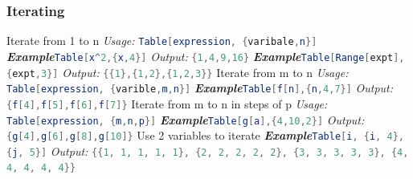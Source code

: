 \documentclass[a4paper]{book}
\begin{document}
\subsubsection{Iterating}
\noindent Iterate from 1 to n
\newline
\emph{Usage:} \lstinline[language=Mathematica]|Table[expression, {varibale,n}]|
\newline
\noindent\emph{\textbf{Example}}\quad \lstinline[language=Mathematica]|Table[x^2,{x,4}]| \hspace{\fill}\emph{Output:} \lstinline[language=Mathematica]|{1,4,9,16}|
\newline
\noindent\emph{\textbf{Example}}\quad \lstinline[language=Mathematica]|Table[Range[expt],{expt,3}]| \hspace{\fill}\emph{Output:} \lstinline[language=Mathematica]|{{1},{1,2},{1,2,3}}|
\newline
\newline
\noindent Iterate from m to n
\newline
\emph{Usage:} \lstinline[language=Mathematica]|Table[expression, {varible,m,n}]|
\newline
\noindent\emph{\textbf{Example}}\quad \lstinline[language=Mathematica]|Table[f[n],{n,4,7}]| \hspace{\fill}\emph{Output:} \lstinline[language=Mathematica]|{f[4],f[5],f[6],f[7]}|
\newline
\newline
\noindent Iterate from m to n in steps of p
\newline
\emph{Usage:} \lstinline[language=Mathematica]|Table[expression, {m,n,p}]|
\newline
\noindent\emph{\textbf{Example}}\quad \lstinline[language=Mathematica]|Table[g[a],{4,10,2}]| \hspace{\fill}\emph{Output:} \lstinline[language=Mathematica]|{g[4],g[6],g[8],g[10]}|
\newline
\newline
\noindent Use 2 variables to iterate
\newline
\noindent\emph{\textbf{Example}}\quad \lstinline[language=Mathematica]|Table[i, {i, 4}, {j, 5}]| \newline
\phantom{x}\hspace{\fill}\emph{Output:} \lstinline[language=Mathematica]|{{1, 1, 1, 1, 1}, {2, 2, 2, 2, 2}, {3, 3, 3, 3, 3}, {4, 4, 4, 4, 4}}|
\newline
\end{document}
